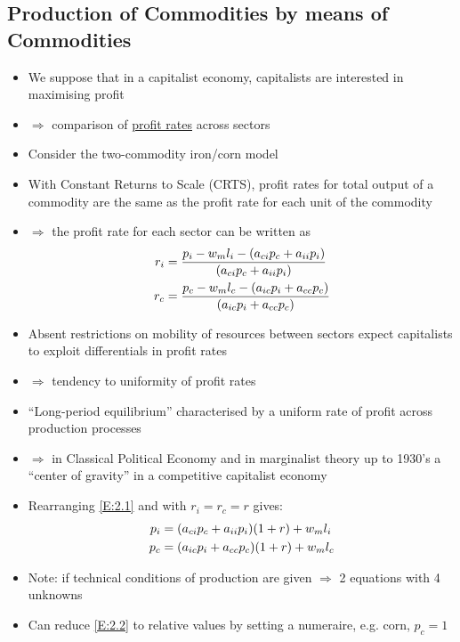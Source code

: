 \documentclass[a4paper,twoside]{article}
\numberwithin{equation}{section}
\numberwithin{figure}{section}
\begin{document}
\subsection{Production of Commodities by means of Commodities}
	\begin{itemize}
		\item We suppose that in a capitalist economy, capitalists are interested in maximising profit
		\item \( \Rightarrow \) comparison of \underline{profit rates} across sectors
		\item Consider the two-commodity iron/corn model
		\item With Constant Returns to Scale (CRTS), profit rates for total output of a commodity are the same as the profit rate for each unit of the commodity
		\item \( \Rightarrow \) the profit rate for each sector can be written as
		\begin{align}
			r_i &= \frac{p_i - w_m l_i - ( a_{ci} p_c +a_{ii} p_i)}{( a_{ci} p_c +a_{ii} p_i)} \notag \\ 
			r_c &= \frac{p_c - w_m l_c - ( a_{ic} p_i +a_{cc} p_c)}{( a_{ic} p_i +a_{cc} p_c)} \label{E:2.1}
		\end{align} 
		\item Absent restrictions on mobility of resources between sectors expect capitalists to exploit differentials in profit rates
		\item \( \Rightarrow \) tendency to uniformity of profit rates
		\item ``\textcolor{myred}{Long-period equilibrium}'' characterised by a uniform rate of profit across production processes
		\item \( \Rightarrow \) in Classical Political Economy and in marginalist theory up to 1930's a ``center of gravity'' in a competitive capitalist economy
		\item  Rearranging \cref{E:2.1} and with \( r_i = r_c = r \) gives:
		\begin{align}
			p_i &= (a_{ci} p_c + a_{ii} p_i) (1 + r) + w_m l_i \notag \\
			p_c &= (a_{ic} p_i + a_{cc} p_c) (1 + r) + w_m l_c \label{E:2.2}
		\end{align}
		\item Note: if technical conditions of  production are given \( \Rightarrow \) 2 equations with 4 unknowns
		\item Can reduce \cref{E:2.2} to relative values by setting a numeraire, e.g. corn, \( p_c = 1 \)

\end{itemize}
\end{document}
